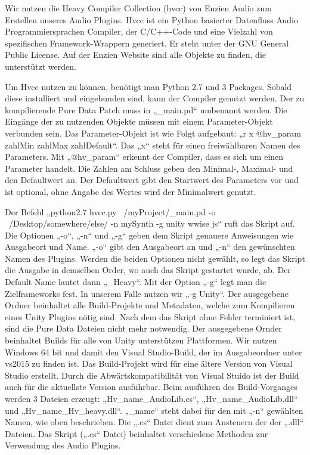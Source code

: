 \documentclass[a4paper, 11pt]{scrartcl}
\begin{document}
Wir nutzen die Heavy Compiler Collection (hvcc) von Enzien Audio zum Erstellen
unseres Audio Plugins.  Hvcc ist ein Python basierter
Datenfluss Audio Programmiersprachen Compiler, der C/C++-Code und eine Vielzahl
von spezifischen Framework-Wrappern generiert. Er steht unter der GNU General
Public License. Auf der Enzien Website sind alle Objekte zu finden, die
unterstützt werden. 

Um Hvcc nutzen zu können, benötigt man Python 2.7 und 3 Packages. Sobald diese
installiert und eingebunden sind, kann der Compiler genutzt werden. Der zu
kompilierende Pure Data Patch muss in „\_main.pd“ umbenannt werden. Die Eingänge
der zu nutzenden Objekte müssen mit einem Parameter-Objekt verbunden sein. Das
Parameter-Objekt ist wie Folgt aufgebaut: „r x @hv\_param zahlMin zahlMax
zahlDefault“. Das „x“ steht für einen freiwählbaren Namen des Parameters. Mit
„@hv\_param“ erkennt der Compiler, dass es sich um einen Parameter handelt. Die
Zahlen am Schluss geben den Minimal-, Maximal- und den Defaultwert an. Der
Defaultwert gibt den Startwert des Parameters vor und ist optional, ohne Angabe
des Wertes wird der Minimalwert genutzt. 

Der Befehl „python2.7 hvcc.py ~/myProject/\_main.pd -o ~/Desktop/somewhere/else/
-n mySynth -g unity wwise js“ ruft das Skript auf. Die Optionen „-o“, „-n“ und
„-g“ geben dem Skript genauere Anweisungen wie Ausgabeort und Name.  „-o“ gibt
den Ausgabeort an und „-n“ den gewünschten Namen des Plugins. Werden die beiden
Optionen nicht gewählt, so legt das Skript die Ausgabe in demselben Order, wo
auch das Skript gestartet wurde, ab. Der Default Name lautet dann „\_Heavy“. Mit
der Option „-g“ legt man die Zielframeworks fest. In unserem Falle nutzen wir
„-g Unity“. Der ausgegebene Ordner beinhaltet alle Build-Projekte und Metadaten,
welche zum Kompilieren eines Unity Plugins nötig sind. Nach dem das Skript ohne
Fehler terminiert ist, sind die Pure Data Dateien nicht mehr notwendig. Der
ausgegebene Ornder beinhaltet Builds für alle von Unity unterstützen
Plattformen. Wir nutzen Windows 64 bit und damit den Visual Studio-Build, der im
Ausgabeordner unter vs2015 zu finden ist. Das Build-Projekt wird für eine ältere
Version von Visual Studio erstellt. Durch die Abwärtskompatibilität von Visual
Stuido ist der Build auch für die aktuellste Version ausführbar.  Beim ausführen
des Build-Vorganges werden 3 Dateien erzeugt: „Hv\_name\_AudioLib.cs“,
„Hv\_name\_AudioLib.dll“ und „Hv\_name\_Hv\_heavy.dll“.  „\_name“ steht dabei
für den mit „-n“ gewählten Namen, wie oben beschrieben.  Die „.cs“ Datei dient
zum Ansteuern der der „.dll“ Dateien. Das Skript („.cs“ Datei) beinhaltet
verschiedene Methoden zur Verwendung des Audio Plugins. 
\end{document}
